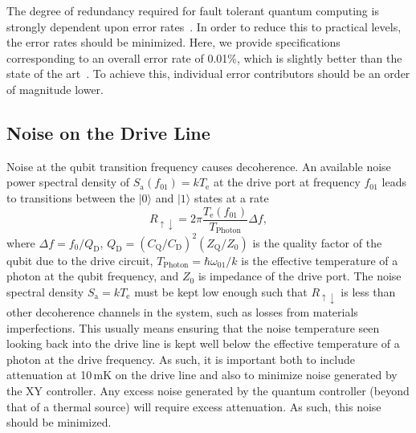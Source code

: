 \documentclass[journal]{IEEEtran}
\newcommand{\CR}[1]{{\color{black}#1}}
\begin{document}
The degree of redundancy required for fault tolerant quantum computing is strongly dependent upon error rates~\cite{fowler2012surface}. In order to reduce this to practical levels, the error rates should be \CR{minimized}. Here, we \CR{provide specifications corresponding to an overall error rate of 0.01\%, which is slightly better than the state of the art~\cite{barends2014superconducting}. To achieve this, individual error contributors should be an order of magnitude lower.}

\subsection{Noise on the Drive Line}
Noise at the qubit transition frequency causes decoherence. An available noise power spectral density of $S_\text{a}\left(f_\text{01}\right)=kT_\text{e}$ at the drive port at frequency $f_\text{01}$ leads to transitions between the $|0\rangle$ and $|1\rangle$ states at a rate~\cite{clerk2010introduction}
\begin{equation}
R_{\uparrow\downarrow}=2\pi\frac{T_\text{e}\left(f_\text{01}\right)}{T_\text{Photon}}\Delta{f},
\end{equation}
where $\Delta{f}=f_\text{0}/Q_\text{D}$, $Q_\text{D}=\left(C_\text{Q}/C_\text{D}\right)^2\left(Z_\text{Q}/Z_\text{0}\right)$ is the quality factor of the qubit due to the drive circuit, $T_\text{Photon}=\hbar\omega_\text{01}/k$ is the effective temperature of a photon at the qubit frequency, and $Z_\text{0}$ is impedance of the drive port. The noise spectral density $S_\text{a}=kT_\text{e}$ must be kept low enough such that $R_{\uparrow \downarrow}$ is less than other decoherence channels in the system, such as losses from materials imperfections. This usually means ensuring that the noise temperature seen looking back into the drive line is kept well below the effective temperature of a photon at the drive frequency. As such, it is important both to include attenuation at 10\,mK on the drive line and also to minimize noise generated by the XY controller. \CR{Any excess noise generated by the quantum controller (beyond that of a thermal source) will require excess attenuation. As such, this noise should be minimized.}
\end{document}

